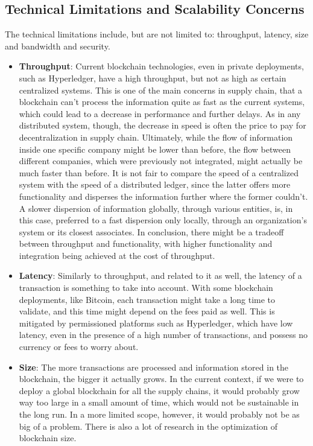 \subsection{Technical Limitations and Scalability Concerns}
The technical limitations include, but are not limited to: throughput, latency, size and bandwidth and security.

\begin{itemize}
\item \textbf{Throughput}: Current blockchain technologies, even in private deployments, such as Hyperledger, have a high throughput, but not as high as certain centralized systems. This is one of the main concerns in supply chain, that a blockchain can't process the information quite as fast as the current systems, which could lead to a decrease in performance and further delays. As in any distributed system, though, the decrease in speed is often the price to pay for decentralization in supply chain. Ultimately, while the flow of information inside one specific company might be lower than before, the flow between different companies, which were previously not integrated, might actually be much faster than before. It is not fair to compare the speed of a centralized system with the speed of a distributed ledger, since the latter offers more functionality and disperses the information further where the former couldn't. A slower dispersion of information globally, through various entities, is, in this case, preferred to a fast dispersion only locally, through an organization's system or its closest associates.
In conclusion, there might be a tradeoff between throughput and functionality, with higher functionality and integration being achieved at the cost of throughput.
\item \textbf{Latency}: Similarly to throughput, and related to it as well, the latency of a transaction is something to take into account. With some blockchain deployments, like Bitcoin, each transaction might take a long time to validate, and this time might depend on the fees paid as well. This is mitigated by permissioned platforms such as Hyperledger, which have low latency, even in the presence of a high number of transactions, and possess no currency or fees to worry about.
\item \textbf{Size}: The more transactions are processed and information stored in the blockchain, the bigger it actually grows. In the current context, if we were to deploy a global blockchain for all the supply chains, it would probably grow way too large in a small amount of time, which would not be sustainable in the long run. In a more limited scope, however, it would probably not be as big of a problem. There is also a lot of research in the optimization of blockchain size.

\end{itemize}
